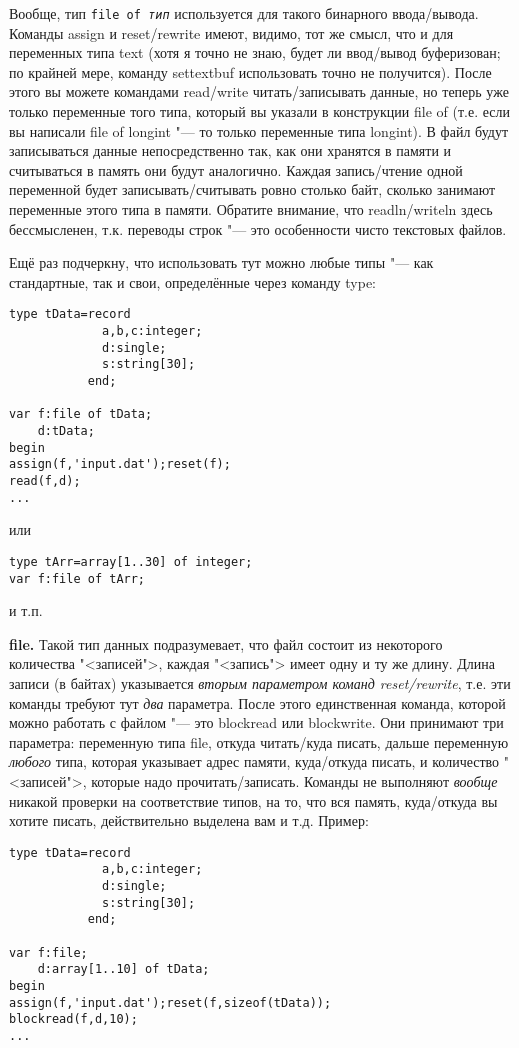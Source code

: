 Вообще, тип \texttt{file of \textit{тип}} используется для такого бинарного ввода/вывода. Команды 
assign и reset/\linebreak[0]rewrite имеют, видимо, тот же смысл, что и для переменных типа text (хотя я точно не 
знаю, будет ли ввод/вывод буферизован; по крайней мере, команду settextbuf использовать точно не 
получится). После этого вы можете командами read/write читать/записывать данные, но теперь уже 
только переменные того типа, который вы указали в конструкции file of (т.е. если вы написали file 
of longint "--- то только переменные типа longint). В файл будут записываться данные 
непосредственно так, как они хранятся в памяти и считываться в память они будут аналогично. Каждая 
запись/чтение одной переменной будет записывать/считывать ровно столько байт, сколько занимают 
переменные этого типа в памяти. Обратите внимание, что readln/writeln здесь бессмысленен, т.к. 
переводы строк "--- это особенности чисто текстовых файлов.

Ещё раз подчеркну, что использовать тут можно любые типы "--- как стандартные, так и свои, 
определённые через команду type:
\begin{codesample}\begin{verbatim}
type tData=record
             a,b,c:integer;
             d:single;
             s:string[30];
           end;
           
var f:file of tData;
    d:tData;
begin
assign(f,'input.dat');reset(f);
read(f,d);
...
\end{verbatim}
\end{codesample}

или
\begin{codesampleo}\begin{verbatim}
type tArr=array[1..30] of integer;
var f:file of tArr;
\end{verbatim}
\end{codesampleo}
и т.п.

\textbf{file.} Такой тип данных подразумевает, что файл состоит из некоторого количества 
"<записей">, каждая "<запись"> имеет одну и ту же длину. Длина записи (в байтах) указывается 
\textit{вторым параметром команд reset/rewrite}, т.е. эти команды требуют тут \textit{два} 
параметра. После этого единственная команда, которой можно работать с файлом "--- это blockread или 
blockwrite. Они принимают три параметра: переменную типа file, откуда читать/куда писать, дальше переменную 
\textit{любого} типа, которая указывает адрес памяти, куда/откуда писать, и количество "<записей">, которые 
надо прочитать/записать. Команды не выполняют \textit{вообще} никакой проверки на соответствие типов, на то, 
что вся память, куда/откуда вы хотите писать, действительно выделена вам и т.д. Пример:
\begin{codesample}\begin{verbatim}
type tData=record
             a,b,c:integer;
             d:single;
             s:string[30];
           end;
           
var f:file;
    d:array[1..10] of tData;
begin
assign(f,'input.dat');reset(f,sizeof(tData));
blockread(f,d,10);
...
\end{verbatim}
\end{codesample}


